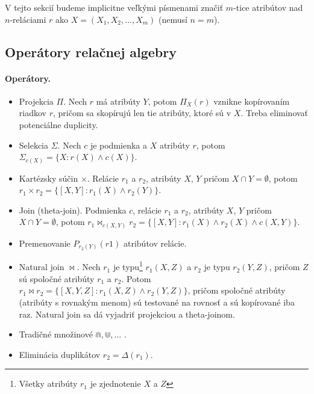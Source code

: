 \documentclass[10pt,a4paper]{article}
\begin{document}
V tejto sekcií budeme implicitne veľkými písmenami značiť $m$-tice atribútov nad $n$-reláciami $r$ ako $X = (X_1, X_2, \ldots, X_m)$ (nemusí $n=m$). 

\subsection{Operátory relačnej algebry}

\paragraph{Operátory.}
\begin{itemize}
\item Projekcia $\Pi$. Nech $r$ má atribúty $Y$, potom $\Pi_X(r)$ vznikne kopírovaním riadkov $r$, pričom sa skopírujú len tie atribúty, ktoré sú v $X$. Treba eliminovať potenciálne duplicity. 
\item Selekcia $\Sigma$. Nech $c$ je podmienka a $X$ atribúty $r$, potom $\Sigma_{c(X)} = \{X:r(X) \wedge c(X)\}$. 
\item Kartézsky súčin $\times$. Relácie $r_1$ a $r_2$, atribúty $X$, $Y$ pričom $X \cap Y = \emptyset$, potom $r_1 \times r_2 = \{[X,Y]:r_1(X) \wedge r_2(Y)\}$.
\item Join (theta-join). Podmienka $c$, relácie $r_1$ a $r_2$, atribúty $X$, $Y$ pričom $X \cap Y = \emptyset$, potom $r_1 \Join_{c(X,Y)} r_2 = \{[X,Y]:r_1(X) \wedge r_2(X) \wedge c(X,Y)\}$.
\item Premenovanie $P_{r_2(Y)}(r1)$ atribútov relácie.
\item Natural join $\Join$. Nech $r_1$ je typu\footnote{Všetky atribúty $r_1$ je zjednotenie $X$ a $Z$} $r_1(X, Z)$ a $r_2$ je typu $r_2(Y, Z)$, pričom $Z$ sú spoločné
atribúty $r_1$ a $r_2$. Potom $r_1 \Join r_2 = \{[X,Y,Z]:r_1(X,Z) \wedge r_2(Y,Z)\}$, pričom
spoločné atribúty (atribúty s rovnakým menom) sú testované na
rovnosť a sú kopírované iba raz. Natural join sa dá vyjadriť projekciou a theta-joinom. 
\item Tradičné množinové $\Cap, \Cup, \ldots $ .
\item Eliminácia duplikátov $r_2 = \Delta(r_1)$.
\end{itemize}
\end{document}
